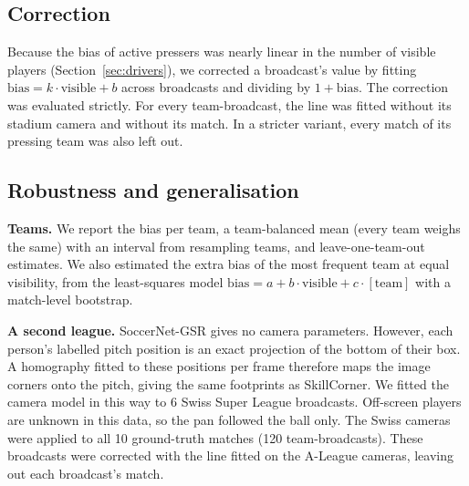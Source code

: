 \documentclass[11pt]{article}
\begin{document}
\subsection{Correction}
Because the bias of active pressers was nearly linear in the number of visible players (Section~\ref{sec:drivers}),
we corrected a broadcast's value by fitting $\text{bias} = k \cdot \text{visible} + b$ across broadcasts and dividing
by $1 + \text{bias}$. The correction was evaluated strictly. For every team-broadcast, the line was fitted without its
stadium camera and without its match. In a stricter variant, every match of its pressing team was also left out.

\subsection{Robustness and generalisation}
\label{sec:robust-methods}
\textbf{Teams.} We report the bias per team, a team-balanced mean (every team weighs the same) with an interval from
resampling teams, and leave-one-team-out estimates. We also estimated the extra bias of the most frequent team at
equal visibility, from the least-squares model $\text{bias} = a + b\cdot\text{visible} + c\cdot[\text{team}]$ with a
match-level bootstrap.

\textbf{A second league.} SoccerNet-GSR gives no camera parameters. However, each person's labelled pitch position
is an exact projection of the bottom of their box. A homography fitted to these positions per frame therefore maps the
image corners onto the pitch, giving the same footprints as SkillCorner. We fitted the camera model in this way to 6
Swiss Super League broadcasts. Off-screen players are unknown in this data, so the pan followed the ball only. The
Swiss cameras were applied to all 10 ground-truth matches (120 team-broadcasts). These broadcasts were corrected with
the line fitted on the A-League cameras, leaving out each broadcast's match.
\end{document}
